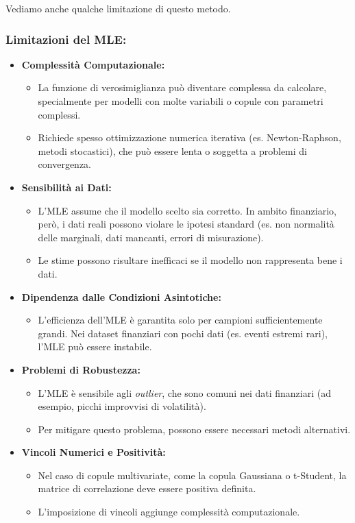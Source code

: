 \documentclass[%
	corpo=11pt,
    twoside,
    stile=classica,
    oldstyle,
    tipotesi=custom,
    greek,
    evenboxes,
]{toptesi}
\begin{document}
Vediamo anche qualche limitazione di questo metodo.\\
\newpage
\subsubsection{Limitazioni del MLE:}

\begin{itemize}
	\item \textbf{Complessità Computazionale:}
	\begin{itemize}
		\item La funzione di verosimiglianza può diventare complessa da calcolare, specialmente per modelli con molte variabili o copule con parametri complessi.
		\item Richiede spesso ottimizzazione numerica iterativa (es. Newton-Raphson, metodi stocastici), che può essere lenta o soggetta a problemi di convergenza.
	\end{itemize}
	
	\item \textbf{Sensibilità ai Dati:}
	\begin{itemize}
		\item L'MLE assume che il modello scelto sia corretto. In ambito finanziario, però, i dati reali possono violare le ipotesi standard (es. non normalità delle marginali, dati mancanti, errori di misurazione).
		\item Le stime possono risultare inefficaci se il modello non rappresenta bene i dati.
	\end{itemize}
	
	\item \textbf{Dipendenza dalle Condizioni Asintotiche:}
	\begin{itemize}
		\item L'efficienza dell'MLE è garantita solo per campioni sufficientemente grandi. Nei dataset finanziari con pochi dati (es. eventi estremi rari), l'MLE può essere instabile.
	\end{itemize}
	
	\item \textbf{Problemi di Robustezza:}
	\begin{itemize}
		\item L'MLE è sensibile agli \textit{outlier}, che sono comuni nei dati finanziari (ad esempio, picchi improvvisi di volatilità).
		\item Per mitigare questo problema, possono essere necessari metodi alternativi.
	\end{itemize}
	
	\item \textbf{Vincoli Numerici e Positività:}
	\begin{itemize}
		\item Nel caso di copule multivariate, come la copula Gaussiana o t-Student, la matrice di correlazione deve essere positiva definita. 
		\item L'imposizione di vincoli aggiunge complessità computazionale.
	\end{itemize}
\end{itemize}
\end{document}
